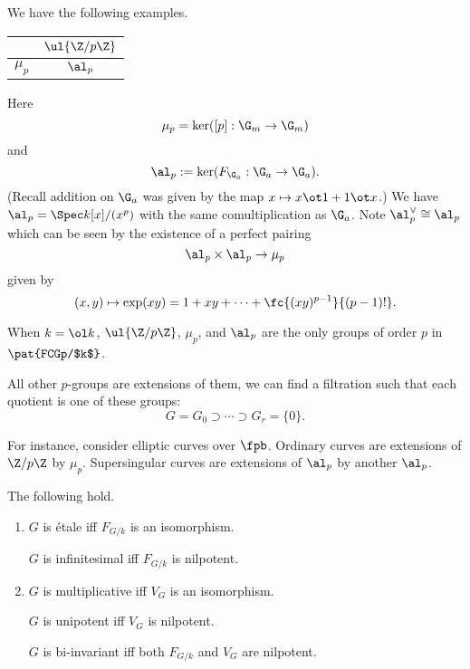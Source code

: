 \begin{ex}
We have the following examples.

\begin{center}
\begin{tabular}{|c|c|}
\cline{2-2} 
\multicolumn{1}{c|}{} & $\ul{\Z/p\Z}$\tabularnewline
\hline 
$\mu_{p}$ & $\al_{p}$\tabularnewline
\hline 
\end{tabular}
\end{center}

Here
\[
\mu_p=\ker([p]:\G_m\to \G_m)
\]
and %
\[
\al_p:=\ker(F_{\G_a}:\G_a\to \G_a).
\]
(Recall addition on $\G_a$ was given by  the map $x\mapsto x\ot 1+1\ot x$.) We have $\al_p=\Spec k[x]/(x^p)$ with the same comultiplication as $\G_a$. %
Note $\al_p^{\vee}\cong \al_p$ which can be seen by the existence of a perfect pairing 
\[
\al_p\times \al_p\to \mu_p
\]
given by 
\[
(x,y)\mapsto \exp(xy)=1+xy+\cdots +\fc{(xy)^{p-1}}{(p-1)!}.
\]
\end{ex}
\begin{fct}
When $k=\ol k$, $\ul{\Z/p\Z}$, $\mu_p$, and $\al_p$ are the only groups of order $p$ in $\pat{FCGp/$k$}$.

All other $p$-groups are extensions of them, we can find a filtration such that each quotient is one of these groups:
\[
G=G_0\supset \cdots\supset G_r=\{0\}.
\]
\end{fct}
\begin{ex}%
For instance, consider elliptic curves over $\fpb$. Ordinary curves are extensions of $\Z/p\Z$ by $\mu_p$. Supersingular curves are  extensions of $\al_p$ by another $\al_p$.
\end{ex}
\begin{pr}
The following hold.
\begin{enumerate}
\item
$G$ is \'etale iff $F_{G/k}$ is an isomorphism.

$G$ is infinitesimal iff $F_{G/k}$ is nilpotent.
\item
$G$ is multiplicative iff $V_G$ is an isomorphism.

$G$ is unipotent iff $V_G$ is nilpotent.

$G$ is bi-invariant iff both $F_{G/k}$ and $V_G$ are nilpotent.
\end{enumerate}
\end{pr}
